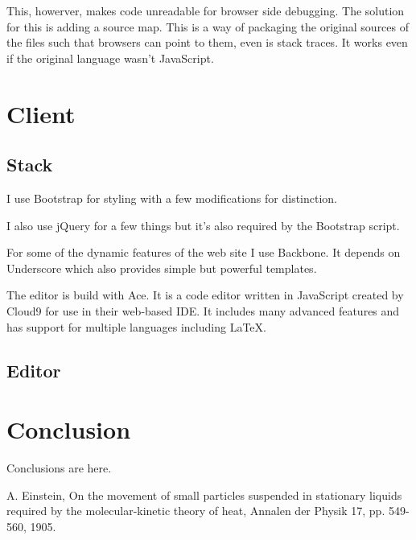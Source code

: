 \documentclass{llncs}
\begin{document}
This, howerver, makes code unreadable for browser side debugging. The solution for this is adding a source map. This is a way of packaging the original sources of the files such that browsers can point to them, even is stack traces. It works even if the original language wasn't JavaScript.

\section{Client}

\subsection{Stack}

I use Bootstrap for styling with a few modifications for distinction.

I also use jQuery for a few things but it's also required by the Bootstrap script.

For some of the dynamic features of the web site I use Backbone. It depends on Underscore which also provides simple but powerful templates.

The editor is build with Ace. It is a code editor written in JavaScript created by Cloud9 for use in their web-based IDE. It includes many advanced features and has support for multiple languages including \LaTeX{}.

\subsection{Editor}

\section{Conclusion}

Conclusions are here.

\begin{thebibliography}{1}

A. Einstein, On the movement of small particles suspended in stationary liquids required by the molecular-kinetic theory of heat, Annalen der Physik 17, pp. 549-560, 1905.

\end{thebibliography}
\end{document}
